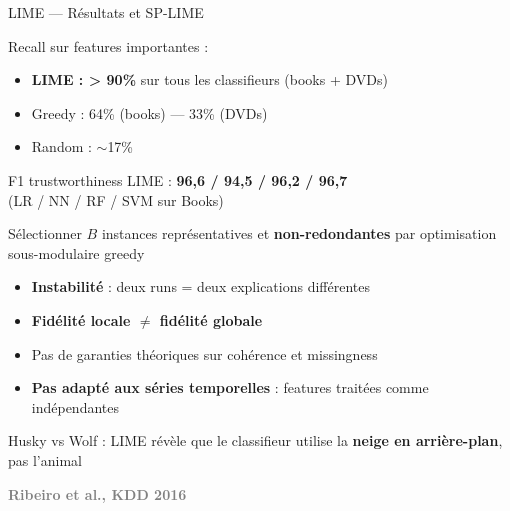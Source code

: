 \documentclass[10pt]{beamer}
\newcommand{\source}[1]{\vspace{6pt}\hfill{\textcolor{gray}{\textbf{\tiny #1}}}}
\begin{document}
\begin{frame}{LIME --- Résultats et SP-LIME}
	\begin{minipage}{0.5\textwidth}
		\begin{tcolorbox}[
			colback=blue!3,
			colframe=blue!40!black,
			arc=2mm,
			boxrule=0.5pt,
			fonttitle=\bfseries,
			title={Résultats (fidélité)}
			]
			Recall sur features importantes :
			\begin{itemize}
				\item \textbf{LIME : > 90\%} sur tous les classifieurs (books + DVDs)
				\item Greedy : 64\% (books) --- 33\% (DVDs)
				\item Random : $\sim$17\%
			\end{itemize}
			F1 trustworthiness LIME : \textbf{96,6 / 94,5 / 96,2 / 96,7}\\
			(LR / NN / RF / SVM sur Books)
		\end{tcolorbox}
		
		\vspace{-0.3cm}
		
		\begin{tcolorbox}[
			colback=green!3,
			colframe=green!40!black,
			arc=2mm,
			boxrule=0.5pt,
			fonttitle=\bfseries,
			title={SP-LIME --- confiance globale}
			]
			Sélectionner $B$ instances représentatives et \textbf{non-redondantes}
			par optimisation sous-modulaire greedy
		\end{tcolorbox}
	\end{minipage}
	\hfill
	\begin{minipage}{0.49\textwidth}
		\begin{tcolorbox}[
			colback=red!3,
			colframe=red!60!black,
			arc=2mm,
			boxrule=0.5pt,
			fonttitle=\bfseries,
			title={Limite clé}
			]
			\begin{itemize}
				\item \textbf{Instabilité} : deux runs = deux explications différentes
				\item \textbf{Fidélité locale $\neq$ fidélité globale}
				\item Pas de garanties théoriques sur cohérence et missingness
				\item \textbf{Pas adapté aux séries temporelles} : features traitées comme indépendantes
			\end{itemize}
		\end{tcolorbox}
		
		\begin{tcolorbox}[
			colback=orange!3,
			colframe=orange!50!black,
			arc=2mm,
			boxrule=0.5pt,
			fonttitle=\bfseries,
			title={Exemple célèbre}
			]
			Husky vs Wolf : LIME révèle que le classifieur utilise la \textbf{neige en arrière-plan}, pas l'animal
		\end{tcolorbox}
	\end{minipage}
	
	\vspace{8pt}
	\source{Ribeiro et al., KDD 2016}
\end{frame}
\end{document}
